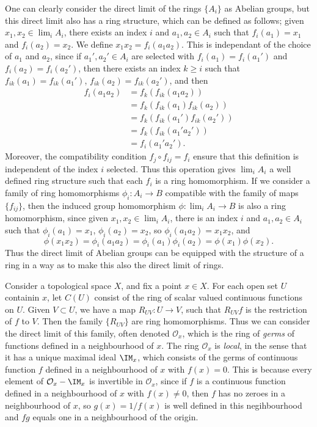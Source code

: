 One can clearly consider the direct limit of the rings $\{ A_i \}$ as Abelian groups, but this direct limit also has a ring structure, which can be defined as follows; given $x_1, x_2 \in \lim_i A_i$, there exists an index $i$ and $a_1, a_2 \in A_i$ such that $f_i(a_1) = x_1$ and $f_i(a_2) = x_2$. We define $x_1x_2 = f_i(a_1a_2)$. This is independant of the choice of $a_1$ and $a_2$, since if $a_1', a_2' \in A_i$ are selected with $f_i(a_1) = f_i(a_1')$ and $f_i(a_2) = f_i(a_2')$, then there exists an index $k \geq i$ such that $f_{ik}(a_1) = f_{ik}(a_1')$, $f_{ik}(a_2) = f_{ik}(a_2')$, and then
%
\begin{align*}
    f_i(a_1a_2) &= f_k(f_{ik}(a_1a_2))\\
    &= f_k(f_{ik}(a_1) f_{ik}(a_2))\\
    &= f_k(f_{ik}(a_1') f_{ik}(a_2'))\\
    &= f_k(f_{ik}(a_1'a_2'))\\
    &= f_i(a_1'a_2').
\end{align*}
%
Moreover, the compatibility condition $f_j \circ f_{ij} = f_i$ ensure that this definition is independent of the index $i$ selected. Thus this operation gives $\lim_i A_i$ a well defined ring structure such that each $f_i$ is a ring homomorphism. If we consider a family of ring homomorphisms $\phi_i: A_i \to B$ compatible with the family of maps $\{ f_{ij} \}$, then the induced group homomorphism $\phi: \lim_i A_i \to B$ is also a ring homomorphism, since given $x_1,x_2 \in \lim_i A_i$, there is an index $i$ and $a_1,a_2 \in A_i$ such that $\phi_i(a_1) = x_1$, $\phi_i(a_2) = x_2$, so $\phi_i(a_1a_2) = x_1x_2$, and
%
\[ \phi(x_1x_2) = \phi_i(a_1a_2) = \phi_i(a_1) \phi_i(a_2) = \phi(x_1) \phi(x_2). \]
%
Thus the direct limit of Abelian groups can be equipped with the structure of a ring in a way as to make this also the direct limit of rings.

\begin{example}
    Consider a topological space $X$, and fix a point $x \in X$. For each open set $U$ containin $x$, let $C(U)$ consist of the ring of scalar valued continuous functions on $U$. Given $V \subset U$, we have a map $R_{UV}: U \to V$, such that $R_{UV}f$ is the restriction of $f$ to $V$. Then the family $\{ R_{UV} \}$ are ring homomorphisms. Thus we can consider the direct limit of this family, often denoted $\mathcal{O}_x$, which is the ring of \emph{germs} of functions defined in a neighbourhood of $x$. The ring $\mathcal{O}_x$ is \emph{local}, in the sense that it has a unique maximal ideal $\IM_x$, which consists of the germs of continuous function $f$ defined in a neighbourhood of $x$ with $f(x) = 0$. This is because every element of $\mathcal{O}_x - \IM_x$ is invertible in $\mathcal{O}_x$, since if $f$ is a continuous function defined in a neighbourhood of $x$ with $f(x) \neq 0$, then $f$ has no zeroes in a neighbourhood of $x$, so $g(x) = 1/f(x)$ is well defined in this negihbourhood and $fg$ equals one in a neighbourhood of the origin.
\end{example}

